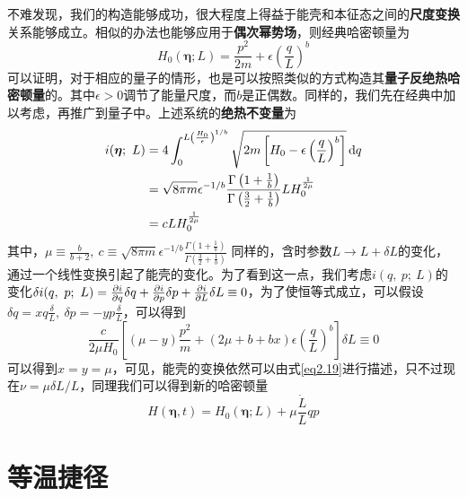 不难发现，我们的构造能够成功，很大程度上得益于能壳和本征态之间的\textbf{尺度变换}关系能够成立。相似的办法也能够应用于\textbf{偶次幂势场}，则经典哈密顿量为
\begin{equation}
    H_{0}(\bm{\eta} ; L)=\frac{p^{2}}{2 m}+\epsilon\left(\frac{q}{L}\right)^{b}
    \label{eq2.26}
\end{equation}
可以证明，对于相应的量子的情形，也是可以按照类似的方式构造其\textbf{量子反绝热哈密顿量}的。其中$\epsilon > 0$调节了能量尺度，而$b$是正偶数。同样的，我们先在经典中加以考虑，再推广到量子中。上述系统的\textbf{绝热不变量}为
\begin{equation}
    \begin{split}
        i(\bm{\eta};\ L) &= 4 \int_0^{L \left(\frac{H_0}{\epsilon}\right)^{1/b}} \sqrt{2 m \left[ H_0 -\epsilon \left(\frac{q}{L}\right)^b\right]} \, \mathrm{d}q \\ 
        &= \sqrt{8 \pi m} \epsilon^{-1 / b} \frac{\Gamma\left(1+\frac{1}{b}\right)}{\Gamma\left(\frac{3}{2}+\frac{1}{b}\right)} L H_0^{\frac{1}{2 \mu}}\\
        &= c L H_0^{\frac{1}{2 \mu}}
    \end{split}
    \label{eq2.27}
\end{equation}
其中，$\mu \equiv \frac{b}{b+2} ,\ c \equiv \sqrt{8 \pi m} \epsilon^{-1 / b} \frac{\Gamma\left(1+\frac{1}{b}\right)}{\Gamma\left(\frac{3}{2}+\frac{1}{b}\right)}$
同样的，含时参数$L \to L + \delta L$的变化，通过一个线性变换引起了能壳的变化。为了看到这一点，我们考虑$i(q,\ p;\ L)$的变化$\delta i(q,\ p;\ L) = \frac{\partial i}{\partial q} \delta q + \frac{\partial i}{\partial p} \delta p + \frac{\partial i}{\partial L} \delta L \equiv 0$，为了使恒等式成立，可以假设$\delta q = x q \frac{\delta}{L},\ \delta p = - y p \frac{\delta}{L}$，可以得到
\begin{equation}
    \frac{c}{2 \mu H_0} \left[ (\mu - y) \frac{p^2}{m} + (2 \mu +b + b x) \epsilon \left( \frac{q}{L} \right)^b \right] \delta L \equiv 0
    \label{eq2.28}
\end{equation}
可以得到$x=y=\mu$，可见，能壳的变换依然可以由式\ref{eq2.19}进行描述，只不过现在$\nu = \mu \delta L / L$，同理我们可以得到新的哈密顿量
\begin{equation}
    H(\bm{\eta}, t)=H_{0}(\bm{\eta} ; L)+\mu \frac{\dot{L}}{L} q p
    \label{eq2.28}
\end{equation}


















\section{等温捷径}
    



